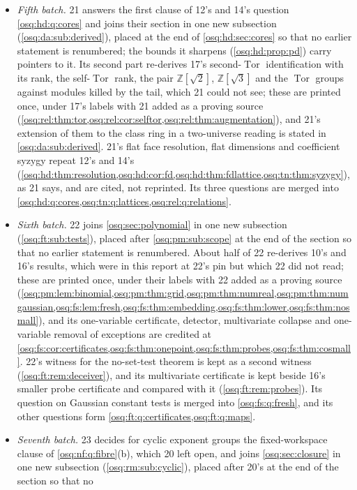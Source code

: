 \documentclass[11pt,letterpaper]{article}
\numberwithin{equation}{section}
\theoremstyle{definition}
\theoremstyle{remark}
\theoremstyle{plain}
\newcommand{\Z}{\mathbb Z}
\newcommand{\Tor}{\operatorname{Tor}}
\begin{document}
\begin{itemize}
\item \emph{Fifth batch.} 21 answers the first clause of 12's and 14's question \cref{osq:hd:q:cores} and joins their section in one new
subsection (\cref{osq:da:sub:derived}), placed at the end of \cref{osq:hd:sec:cores} so that no earlier statement is renumbered; the
bounds it sharpens (\cref{osq:hd:prop:pd}) carry pointers to it. Its second part re-derives 17's second-$\Tor$ identification with its rank,
the self-$\Tor$ rank, the pair $\Z[\sqrt2]$, $\Z[\sqrt3]$ and the $\Tor$ groups against modules killed by the tail, which 21 could not see;
these are printed once, under 17's labels with 21 added as a proving source (\cref{osq:rel:thm:tor,osq:rel:cor:selftor,osq:rel:thm:augmentation}),
and 21's extension of them to the class ring in a two-universe reading is stated in \cref{osq:da:sub:derived}. 21's flat face resolution,
flat dimensions and coefficient syzygy repeat 12's and 14's (\cref{osq:hd:thm:resolution,osq:hd:cor:fd,osq:hd:thm:fdlattice,osq:tn:thm:syzygy}),
as 21 says, and are cited, not reprinted. Its three questions are merged into \cref{osq:hd:q:cores,osq:tn:q:lattices,osq:rel:q:relations}.
\item \emph{Sixth batch.} 22 joins \cref{osq:sec:polynomial} in one new subsection (\cref{osq:ft:sub:tests}), placed after \cref{osq:pm:sub:scope} at the
end of the section so that no earlier statement is renumbered. About half of 22 re-derives 10's and 16's results, which were in this report at 22's pin
but which 22 did not read; these are printed once, under their labels with 22 added as a proving source
(\cref{osq:pm:lem:binomial,osq:pm:thm:grid,osq:pm:thm:numreal,osq:pm:thm:numgaussian,osq:fs:lem:fresh,osq:fs:thm:embedding,osq:fs:thm:lower,osq:fs:thm:nosmall}),
and its one-variable certificate, detector, multivariate collapse and one-variable removal of exceptions are credited at
\cref{osq:fs:cor:certificates,osq:fs:thm:onepoint,osq:fs:thm:probes,osq:fs:thm:cosmall}. 22's witness for the no-set-test theorem is kept as a second
witness (\cref{osq:ft:rem:deceiver}), and its multivariate certificate is kept beside 16's smaller probe certificate and compared with it
(\cref{osq:ft:rem:probes}). Its question on Gaussian constant tests is merged into \cref{osq:fs:q:fresh}, and its other questions form
\cref{osq:ft:q:certificates,osq:ft:q:maps}.
\item \emph{Seventh batch.} 23 decides for cyclic exponent groups the fixed-workspace clause of \cref{osq:nf:q:fibre}(b), which 20 left open,
and joins \cref{osq:sec:closure} in one new subsection (\cref{osq:rm:sub:cyclic}), placed after 20's at the end of the section so that no

\end{itemize}
\end{document}

